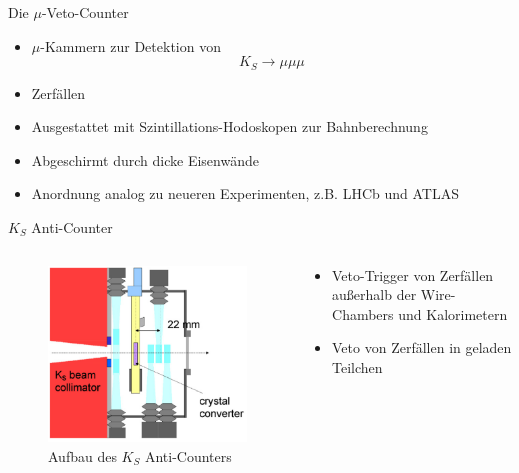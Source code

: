 \documentclass[aspectratio=1610, professionalfonts, 9pt, t]{beamer}
\begin{document}
  \begin{frame}{Die $\mu$-Veto-Counter}
    \begin{itemize}
      \item $\mu$-Kammern zur Detektion von
      \begin{equation*}
        K_S \rightarrow \mu \mu \mu
      \end{equation*}
      \item[] Zerfällen
      \item Ausgestattet mit Szintillations-Hodoskopen zur Bahnberechnung
      \item Abgeschirmt durch dicke Eisenwände
      \item[\rightarrow] Anordnung analog zu neueren Experimenten, z.B. LHCb und ATLAS
    \end{itemize}
  \end{frame}

  \begin{frame}{$K_S$ Anti-Counter}
    \begin{columns}[onlytextwidth]
      \begin{column}{0.4\textwidth}
        \begin{figure}[ht]
          \begin{center}
            \includegraphics[height=0.7\textheight]{Images/na48aks.png} %
            \caption{Aufbau des $K_S$ Anti-Counters}
          \end{center}
        \end{figure}
      \end{column}
      \begin{column}{0.5\textwidth}
        \begin{itemize}
          \item Veto-Trigger von Zerfällen außerhalb der Wire-Chambers und Kalorimetern
          \item[\rightarrow] Veto von Zerfällen in geladen Teilchen
        \end{itemize}
      \end{column}
    \end{columns}
  \end{frame}
\end{document}
